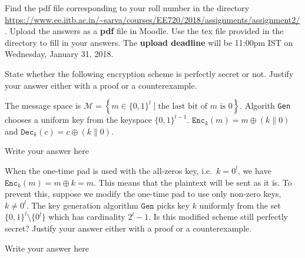 \documentclass[12pt,a4paper,answers]{exam}
\begin{document}
\pagestyle{head}
\headrule
{}
%

\extraheadheight{.4in}%
\extrafootheight{-0.5in}%
\extrawidth{0.5in}%

Find the pdf file corresponding to your roll number in the directory \url{https://www.ee.iitb.ac.in/~sarva/courses/EE720/2018/assignments/assignment2/}. Upload the answers as a \textbf{pdf} file in Moodle. Use the tex file provided in the directory to fill in your answers. The \textbf{upload deadline} will be 11:00pm IST on Wednesday, January 31, 2018.
\begin{questions}
\question[5] State whether the following encryption scheme is perfectly secret or not. Justify your answer either with a proof or a counterexample.

  The message space is $\mathcal{M} = \left\{ m \in \{0,1\}^l \mid \textrm{the last bit of $m$ is 0} \right\}$. Algorith \texttt{Gen} chooses a uniform key from the keyspace $\{0,1\}^{l-1}$. $\texttt{Enc}_k(m) = m \oplus (k \| 0)$ and $\texttt{Dec}_k(c) = c \oplus (k \| 0)$.
  \begin{solution}
    Write your answer here
  \end{solution}

  \question[5] When the one-time pad is used with the all-zeros key, i.e.~$k = 0^l$, we have $\texttt{Enc}_k(m) = m \oplus k = m$. This means that the plaintext will be sent as it is. To prevent this, suppose we modify the one-time pad to use only non-zero keys, $k \neq 0^l$. The key generation algorithm $\texttt{Gen}$ picks key $k$ uniformly from the set $\{0,1\}^l \setminus \{0^l\}$ which has cardinality $2^l - 1$. Is this modified scheme still perfectly secret? Justify your answer either with a proof or a counterexample.
  \begin{solution}
    Write your answer here
  \end{solution}

  
\end{questions}
\end{document}
